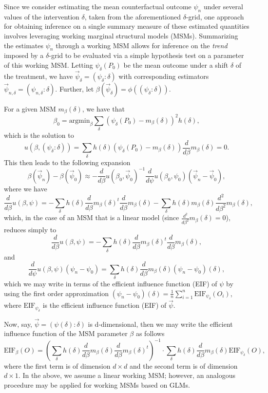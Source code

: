 \documentclass[12pt, krantz2,]{book}
\theoremstyle{definition}
\theoremstyle{definition}
\theoremstyle{definition}
\newcommand{\1}{\mathbbm{1}}
\begin{document}
Since we consider estimating the mean counterfactual outcome \(\psi_n\) under
several values of the intervention \(\delta\), taken from the aforementioned
\(\delta\)-grid, one approach for obtaining inference on a single summary measure
of these estimated quantities involves leveraging working marginal structural
models (MSMs). Summarizing the estimates \(\psi_n\) through a working MSM allows
for inference on the \emph{trend} imposed by a \(\delta\)-grid to be evaluated via a
simple hypothesis test on a parameter of this working MSM. Letting
\(\psi_{\delta}(P_0)\) be the mean outcome under a shift \(\delta\) of the
treatment, we have \(\vec{\psi}_{\delta} = (\psi_{\delta}: \delta)\) with
corresponding estimators \(\vec{\psi}_{n, \delta} = (\psi_{n, \delta}: \delta)\).
Further, let \(\beta(\vec{\psi}_{\delta}) = \phi((\psi_{\delta}: \delta))\).

For a given MSM \(m_{\beta}(\delta)\), we have that
\[\beta_0 = \text{argmin}_{\beta} \sum_{\delta}(\psi_{\delta}(P_0) -
m_{\beta}(\delta))^2 h(\delta),\]
which is the solution to
\[u(\beta, (\psi_{\delta}: \delta)) = \sum_{\delta}h(\delta)
\left(\psi_{\delta}(P_0) - m_{\beta}(\delta) \right) \frac{d}{d\beta}
m_{\beta}(\delta) = 0.\]
This then leads to the following expansion
\[\beta(\vec{\psi}_n) - \beta(\vec{\psi}_0) \approx -\frac{d}{d\beta}
  u(\beta_0, \vec{\psi}_0)^{-1} \frac{d}{d\psi} u(\beta_0, \psi_0)
  (\vec{\psi}_n - \vec{\psi}_0),\]
where we have
\[\frac{d}{d\beta} u(\beta, \psi) = -\sum_{\delta} h(\delta) \frac{d}{d\beta}
m_{\beta}(\delta)^t \frac{d}{d\beta} m_{\beta}(\delta)
-\sum_{\delta} h(\delta) m_{\beta}(\delta) \frac{d^2}{d\beta^2}
m_{\beta}(\delta),\]
which, in the case of an MSM that is a linear model (since
\(\frac{d^2}{d\beta^2} m_{\beta}(\delta) = 0\)), reduces simply to
\[\frac{d}{d\beta} u(\beta, \psi) = -\sum_{\delta} h(\delta) \frac{d}{d\beta}
m_{\beta}(\delta)^t \frac{d}{d\beta} m_{\beta}(\delta),\]
and
\[\frac{d}{d\psi}u(\beta, \psi)(\psi_n - \psi_0) = \sum_{\delta} h(\delta)
\frac{d}{d\beta} m_{\beta}(\delta) (\psi_n - \psi_0)(\delta),\]
which we may write in terms of the efficient influence function (EIF) of \(\psi\)
by using the first order approximation \((\psi_n - \psi_0)(\delta) = \frac{1}{n}\sum_{i = 1}^n \text{EIF}_{\psi_{\delta}}(O_i)\),
where \(\text{EIF}_{\psi_{\delta}}\) is the efficient influence function (EIF) of
\(\vec{\psi}\).

Now, say, \(\vec{\psi} = (\psi(\delta): \delta)\) is d-dimensional, then we may
write the efficient influence function of the MSM parameter \(\beta\) as follows
\[\text{EIF}_{\beta}(O) = \left(\sum_{\delta} h(\delta) \frac{d}{d\beta}
m_{\beta}(\delta) \frac{d}{d\beta} m_{\beta}(\delta)^t \right)^{-1} \cdot
\sum_{\delta} h(\delta) \frac{d}{d\beta} m_{\beta}(\delta)
\text{EIF}_{\psi_{\delta}}(O),\] where the first term is of dimension
\(d \times d\) and the second term is of dimension \(d \times 1\). In the above, we
assume a linear working MSM; however, an analogous procedure may be applied for
working MSMs based on GLMs.
\end{document}
